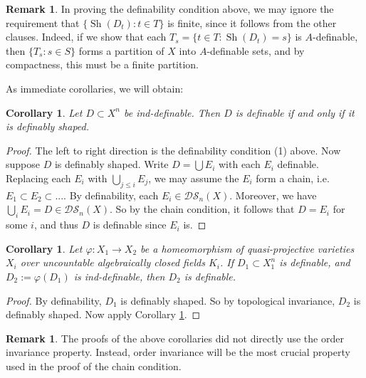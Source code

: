 \documentclass{amsart}
\newtheorem{corollary}[theorem]{Corollary}
\theoremstyle{definition}
\newtheorem{remark}[theorem]{Remark}
\begin{document}
\begin{remark}\label{R: finitely many shapes automatic}
    In proving the definability condition above, we may ignore the requirement that $\{\operatorname{Sh}(D_t):t\in T\}$ is finite, since it follows from the other clauses. Indeed, if we show that each $T_s=\{t\in T:\operatorname{Sh}(D_t)=s\}$ is $A$-definable, then $\{T_s:s\in S\}$ forms a partition of $X$ into $A$-definable sets, and by compactness, this must be a finite partition.
\end{remark}

As immediate corollaries, we will obtain:

\begin{corollary}\label{C: ind-definable and shaped implies definable}
    Let $D\subset X^n$ be ind-definable. Then $D$ is definable if and only if it is definably shaped.
\end{corollary}
\begin{proof}
    The left to right direction is the definability condition (1) above. Now suppose $D$ is definably shaped. Write $D=\bigcup E_i$ with each $E_i$ definable. Replacing each $E_i$ with $\bigcup_{j\leq i}E_j$, we may assume the $E_i$ form a chain, i.e. $E_1\subset E_2\subset...$. By definability, each $E_i\in\mathcal{DS}_n(X)$. Moreover, we have $\bigcup_iE_i=D\in\mathcal{DS}_n(X)$. So by the chain condition, it follows that $D=E_i$ for some $i$, and thus $D$ is definable since $E_i$ is. 
\end{proof}

\begin{corollary}\label{C: ind-definable implies definable}
    Let $\varphi:X_1\rightarrow X_2$ be a homeomorphism of quasi-projective varieties $X_i$ over uncountable algebraically closed fields $K_i$. If $D_1\subset X_1^n$ is definable, and $D_2:=\varphi(D_1)$ is ind-definable, then $D_2$ is definable.
\end{corollary}
\begin{proof}
    By definability, $D_1$ is definably shaped. So by topological invariance, $D_2$ is definably shaped. Now apply Corollary \ref{C: ind-definable and shaped implies definable}.
\end{proof}

\begin{remark}
    The proofs of the above corollaries did not directly use the order invariance property. Instead, order invariance will be the most crucial property used in the proof of the chain condition. 
\end{remark}
\end{document}
